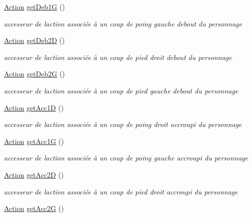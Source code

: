 \begin{DoxyCompactItemize}
\hyperlink{class_action}{Action} \hyperlink{class_personnage_ab4e39817921a74cb9265307cf52cc3d6}{get\+Deb1G} ()
\begin{DoxyCompactList}\small\item\em accesseur de l\textquotesingle{}action associée à un coup de poing gauche debout du personnage \end{DoxyCompactList}\item 
\hyperlink{class_action}{Action} \hyperlink{class_personnage_a5380bd06c8e29368ae0e46069ad527fc}{get\+Deb2D} ()
\begin{DoxyCompactList}\small\item\em accesseur de l\textquotesingle{}action associée à un coup de pied droit debout du personnage \end{DoxyCompactList}\item 
\hyperlink{class_action}{Action} \hyperlink{class_personnage_a16e50e2bc84c18d08cd0128b8db0e999}{get\+Deb2G} ()
\begin{DoxyCompactList}\small\item\em accesseur de l\textquotesingle{}action associée à un coup de pied gauche debout du personnage \end{DoxyCompactList}\item 
\hyperlink{class_action}{Action} \hyperlink{class_personnage_ad556b91118a0d444c69e6bf0083f2f3d}{get\+Acc1D} ()
\begin{DoxyCompactList}\small\item\em accesseur de l\textquotesingle{}action associée à un coup de poing droit accroupi du personnage \end{DoxyCompactList}\item 
\hyperlink{class_action}{Action} \hyperlink{class_personnage_abddbd853934d7bdf5f12f78d3b9c03e1}{get\+Acc1G} ()
\begin{DoxyCompactList}\small\item\em accesseur de l\textquotesingle{}action associée à un coup de poing gauche accroupi du personnage \end{DoxyCompactList}\item 
\hyperlink{class_action}{Action} \hyperlink{class_personnage_aa57428d84c280ebbbfd3d39de64607cd}{get\+Acc2D} ()
\begin{DoxyCompactList}\small\item\em accesseur de l\textquotesingle{}action associée à un coup de pied droit accroupi du personnage \end{DoxyCompactList}\item 
\hyperlink{class_action}{Action} \hyperlink{class_personnage_a91c733051d83e5205f10d5e8c3b402bc}{get\+Acc2G} ()

\end{DoxyCompactItemize}
